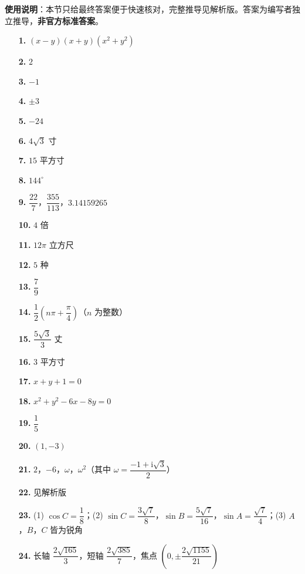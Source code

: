 
\begin{gknotice}
\textbf{使用说明}：本节只给最终答案便于快速核对，完整推导见解析版。答案为编写者独立推导，\textbf{非官方标准答案}。
\end{gknotice}

\begin{itemize}[leftmargin=2.6em]
  \item[\textbf{1.}] $(x-y)(x+y)(x^2+y^2)$
  \item[\textbf{2.}] $2$
  \item[\textbf{3.}] $-1$
  \item[\textbf{4.}] $\pm3$
  \item[\textbf{5.}] $-24$
  \item[\textbf{6.}] $4\sqrt3$ 寸
  \item[\textbf{7.}] $15$ \mbox{平方寸}
  \item[\textbf{8.}] $144^\circ$
  \item[\textbf{9.}] $\dfrac{22}{7}$，$\dfrac{355}{113}$，$3.14159265$
  \item[\textbf{10.}] $4$ 倍
  \item[\textbf{11.}] $12\pi$ 立方尺
  \item[\textbf{12.}] $5$ 种
  \item[\textbf{13.}] $\dfrac79$
  \item[\textbf{14.}] $\dfrac12\left(n\pi+\dfrac\pi4\right)$（$n$ 为整数）
  \item[\textbf{15.}] $\dfrac{5\sqrt3}{3}$ 丈
  \item[\textbf{16.}] $3$ \mbox{平方寸}
  \item[\textbf{17.}] $x+y+1=0$
  \item[\textbf{18.}] $x^2+y^2-6x-8y=0$
  \item[\textbf{19.}] $\dfrac15$
  \item[\textbf{20.}] $(1,-3)$
\end{itemize}

\begin{itemize}[leftmargin=2.6em]
  \item[\textbf{21.}] $2$，$-6$，$\omega$，$\omega^2$（其中 $\omega=\dfrac{-1+\mathrm i\sqrt3}{2}$）
  \item[\textbf{22.}] 见解析版
  \item[\textbf{23.}] (1) $\cos C=\dfrac18$；(2) $\sin C=\dfrac{3\sqrt7}{8}$，$\sin B=\dfrac{5\sqrt7}{16}$，$\sin A=\dfrac{\sqrt7}{4}$；(3) $A$，$B$，$C$ 皆为锐角
  \item[\textbf{24.}] 长轴 $\dfrac{2\sqrt{165}}{3}$，短轴 $\dfrac{2\sqrt{385}}{7}$，焦点 $\left(0,\pm\dfrac{2\sqrt{1155}}{21}\right)$
\end{itemize}
